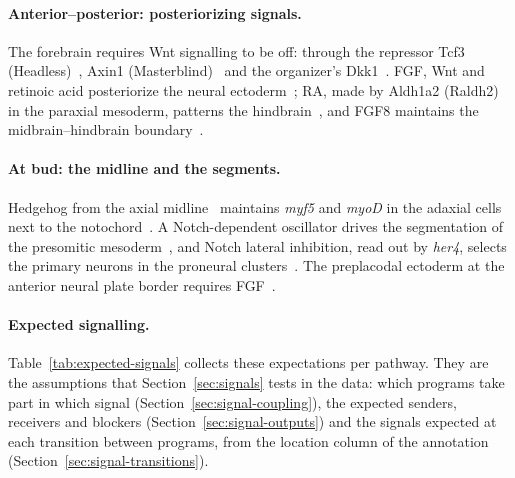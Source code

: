 \documentclass[11pt,a4paper]{article}
\begin{document}
\paragraph{Anterior--posterior: posteriorizing signals.} The forebrain requires Wnt signalling to be off: through the repressor Tcf3 (Headless)~\cite{kim2000}, Axin1 (Masterblind)~\cite{heisenberg2001} and the organizer's Dkk1~\cite{hashimoto2000dkk1}. FGF, Wnt and retinoic acid posteriorize the neural ectoderm~\cite{kudoh2002}; RA, made by Aldh1a2 (Raldh2) in the paraxial mesoderm, patterns the hindbrain~\cite{begemann2001,grandel2002}, and FGF8 maintains the midbrain--hindbrain boundary~\cite{reifers1998}.

\paragraph{At bud: the midline and the segments.} Hedgehog from the axial midline~\cite{krauss1993} maintains \emph{myf5} and \emph{myoD} in the adaxial cells next to the notochord~\cite{coutelle2001}. A Notch-dependent oscillator drives the segmentation of the presomitic mesoderm~\cite{holley2000,holley2002}, and Notch lateral inhibition, read out by \emph{her4}, selects the primary neurons in the proneural clusters~\cite{takke1999}. The preplacodal ectoderm at the anterior neural plate border requires FGF~\cite{kwon2010}.

\paragraph{Expected signalling.} Table~\ref{tab:expected-signals} collects these expectations per pathway. They are the assumptions that Section~\ref{sec:signals} tests in the data: which programs take part in which signal (Section~\ref{sec:signal-coupling}), the expected senders, receivers and blockers (Section~\ref{sec:signal-outputs}) and the signals expected at each transition between programs, from the location column of the annotation (Section~\ref{sec:signal-transitions}).
\end{document}
